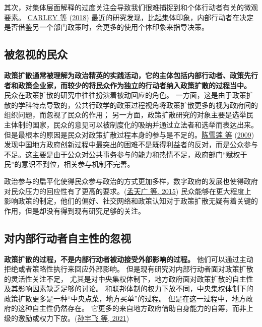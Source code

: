 \documentclass[
  12pt,
]{ctexart}
\begin{document}
其次，对集体层面解释的过度关注会导致我们很难捕捉到和个体行动者有关的微观要素。
\protect\hyperlink{ref-CarleyNicholson-Crotty2018}{CARLEY 等} (\protect\hyperlink{ref-CarleyNicholson-Crotty2018}{2018}) 最近的研究发现，比起集体印象，内部行动者在决定是否借鉴另一个部门政策时，会更多的使用个体印象来指导决策。

\hypertarget{ux88abux5ffdux89c6ux7684ux6c11ux4f17}{%
\subsection{被忽视的民众}\label{ux88abux5ffdux89c6ux7684ux6c11ux4f17}}

\textbf{政策扩散通常被理解为政治精英的实践活动，它的主体包括内部行动者、政策先行者和政策企业家，而较少的将民众作为独立的行动者纳入政策扩散的过程当中。}
民众在政策扩散的研究中往往扮演着被动回应的角色。
一方面，这是由于政策扩散的学科特点导致的，公共行政学的政策过程视角将政策扩散更多的视为政府间的组织问题，而忽视了民众的作用；
另一方面，政策扩散研究的对象主要是选举民主体制的国家，民众的意见可以被制度化的吸纳并通过立法者和选举而表达出来。
但是最根本的原因是民众对政策扩散过程本身的参与是不足的。\protect\hyperlink{ref-ChenXueLianYangXueDong2009}{陈雪莲 等} (\protect\hyperlink{ref-ChenXueLianYangXueDong2009}{2009}) 发现中国地方政府创新过程中最突出的困难不是既得利益者的反对，而是公众参与不足。这主要是由于公众对公共事务参与的能力和热情不足，政府部门``赋权于民''的意识不到位，相关参与机制不完善。

政治参与的扁平化使得民众参与政治的方式更加多样，数字政府的发展也使得政府对民众压力的回应性有了更高的要求。(\protect\hyperlink{ref-MengTianGuangLiFeng2015a}{孟天广 等, 2015})
民众能够在更大程度上影响政策的制定，他们的偏好、社交网络和政策认知对于政策扩散无疑有着关键的作用，但是却没有得到现有研究足够的关注。

\hypertarget{ux5bf9ux5185ux90e8ux884cux52a8ux8005ux81eaux4e3bux6027ux7684ux5ffdux89c6}{%
\subsection{对内部行动者自主性的忽视}\label{ux5bf9ux5185ux90e8ux884cux52a8ux8005ux81eaux4e3bux6027ux7684ux5ffdux89c6}}

\textbf{政策扩散的过程，不是内部行动者被动接受外部影响的过程。}
他们可以通过主动拒绝或者策略性执行来回应外部影响。
但是现有研究对内部行动者面对政策扩散的灵活性关注不足，
尤其是对中央集权体制下，地方政府面对政策扩散的自主性及其影响因素缺乏足够的讨论。
和联邦体制的权力下放不同，中央集权体制下的政策扩散更多是一种``中央点菜，地方买单''的过程。
但是在这一过程中，地方政府的这种自主性仍然存在。
它更多的来自地方政府借助自身能力的自筹，而非上级的激励或权力下放。(\protect\hyperlink{ref-SunYuFeiYangXueDong2021}{孙宇飞 等, 2021})
\end{document}

